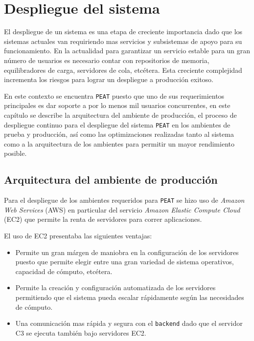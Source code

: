 \chapter{Despliegue del sistema}

El despliegue de un sistema es una etapa de creciente importancia dado que los
sistemas actuales van requiriendo mas servicios y subsistemas de apoyo para
su funcionamiento. En la actualidad para garantizar un servicio estable para
un gran número de usuarios es necesario contar con repositorios de memoria,
equilibradores de carga, servidores de cola, etcétera. Esta creciente complejidad
incrementa los riesgos para lograr un despliegue a producción exitoso.

En este contexto se encuentra \texttt{PEAT} puesto que uno de sus requerimientos
principales es dar soporte a por lo menos mil usuarios concurrentes, en este
capítulo se describe la arquitectura del ambiente de producción, el proceso
de despliegue continuo para el despliegue del sistema \texttt{PEAT} en los
ambientes de prueba y producción, así como las optimizaciones realizadas
tanto al sistema como a la arquitectura de los ambientes para permitir un mayor
rendimiento posible.

\section{Arquitectura del ambiente de producción}
\label{sec:production}

Para el despliegue de los ambientes requeridos para \texttt{PEAT} se hizo uso de
\textit{Amazon Web Services} (AWS) en particular del servicio
\textit{Amazon Elastic Compute Cloud} (EC2) que permite la renta de servidores
para correr aplicaciones.

El uso de EC2 presentaba las siguientes ventajas:
\begin{itemize}
\item Permite un gran márgen de maniobra en la configuración de los servidores
  puesto que permite elegir entre una gran variedad de sistema operativos,
  capacidad de cómputo, etcétera.
\item Permite la creación y configuración automatizada de los servidores
  permitiendo que el sistema pueda escalar rápidamente según las necesidades
  de cómputo.
\item Una comunicación mas rápida y segura con el \texttt{backend} dado que el
  servidor C3 se ejecuta también bajo servidores EC2.
\end{itemize}

